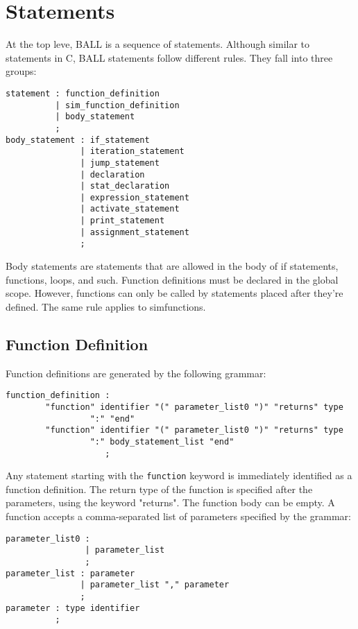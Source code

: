 \section{Statements}\label{Stmts}
At the top leve, BALL is a sequence of statements. Although similar to
statements in C, BALL statements follow different rules. They fall
into three groups:

\begin{verbatim}
statement : function_definition
          | sim_function_definition
          | body_statement
          ;
body_statement : if_statement
               | iteration_statement
               | jump_statement
               | declaration
               | stat_declaration
               | expression_statement
               | activate_statement
               | print_statement
               | assignment_statement
               ;
\end{verbatim}

Body statements are statements that are allowed in the body of if
statements, functions, loops, and such. Function definitions must be
declared in the global scope. However, functions can only be called by
statements placed after they're defined. The same rule applies to
simfunctions.

\subsection{Function Definition}\label{FuncDef}
Function definitions are generated by the following grammar:

\begin{verbatim}
function_definition : 
        "function" identifier "(" parameter_list0 ")" "returns" type
                 ":" "end"
        "function" identifier "(" parameter_list0 ")" "returns" type
                 ":" body_statement_list "end"
                    ;
\end{verbatim}

Any statement starting with the \texttt{function} keyword is
immediately identified as a function definition. The return type of
the function is specified after the parameters, using the keyword
"returns". The function body can be empty. A function accepts a
comma-separated list of parameters specified by the grammar:

\begin{verbatim}
parameter_list0 :
                | parameter_list
                ;
parameter_list : parameter
               | parameter_list "," parameter
               ;
parameter : type identifier
          ;
\end{verbatim}

